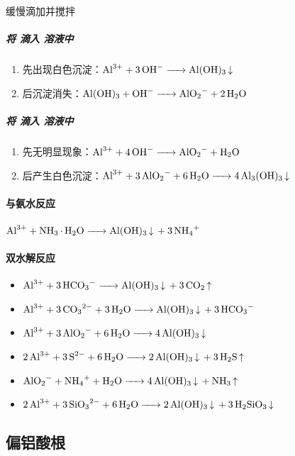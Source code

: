 缓慢滴加并搅拌

\subparagraph{将 滴入 溶液中}

\begin{enumerate}
	\item 先出现白色沉淀：$\ce{Al^3+ + 3OH- -> Al(OH)3 v}\\$
	\item 后沉淀消失：$\ce{Al(OH)3 + OH- -> AlO2- + 2H2O}\\$
\end{enumerate}

\subparagraph{将 滴入 溶液中}

\begin{enumerate}
	\item 先无明显现象：$\ce{Al^3+ + 4OH- -> AlO2- + H2O}\\$
	\item 后产生白色沉淀：$\ce{Al^3+ + 3AlO2- + 6H2O -> 4Al3(OH)3 v}\\$
\end{enumerate}

\paragraph{与氨水反应}

$\ce{Al^3+ + NH3*H2O -> Al(OH)3 v + 3NH4+}\\$

\paragraph{双水解反应}

\begin{itemize}
	\item $\ce{Al^3+ + 3HCO3- -> Al(OH)3 v + 3CO2 ^}$
	\item $\ce{Al^3+ + 3CO3^2- + 3H2O -> Al(OH)3 v + 3HCO3-}$
	\item $\ce{Al^3+ + 3AlO2- + 6H2O -> 4Al(OH)3 v}$
	\item $\ce{2Al^3+ + 3S^2- + 6H2O -> 2Al(OH)3 v + 3H2S ^}$
	\item $\ce{AlO2- + NH4+ + H2O -> 4Al(OH)3 v + NH3 ^}$
	\item $\ce{2Al^3+ + 3SiO3^2- + 6H2O -> 2Al(OH)3 v + 3H2SiO3 v}$
\end{itemize}

\subsection{偏铝酸根}

